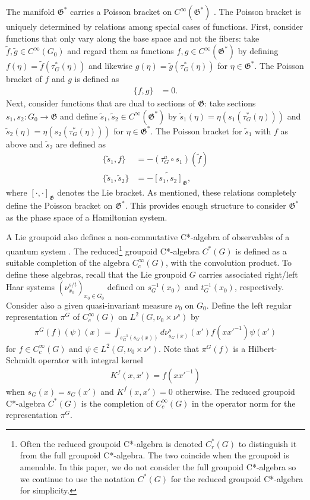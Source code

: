 \documentclass[sn-mathphys,Numbered]{sn-jnl}
\begin{document}
The manifold $\mathfrak{G}^*$ carries a Poisson bracket on $C^\infty(\mathfrak{G}^*)$ \citep{La98b,La99}.  The Poisson bracket is uniquely determined by relations among special cases of functions.  First, consider functions that only vary along the base space and not the fibers: take $\tilde{f},\tilde{g}\in C^\infty(G_0)$ and regard them as functions $f,g\in C^\infty(\mathfrak{G}^*)$ by defining $f(\eta) = \tilde{f}(\tau_G^*(\eta))$ and likewise $g(\eta) = \tilde{g}(\tau_G^*(\eta))$ for $\eta\in\mathfrak{G}^*$.  The Poisson bracket of $f$ and $g$ is defined as
\begin{align}
    \{f,g\} &= 0.
    \end{align}
Next, consider functions that are dual to sections of $\mathfrak{G}$: take sections $s_1,s_2: G_0\to \mathfrak{G}$ and define $\tilde{s}_1,\tilde{s}_2\in C^\infty(\mathfrak{G}^*)$ by $\tilde{s}_1(\eta) = \eta(s_1(\tau^*_G(\eta)))$ and $\tilde{s}_2(\eta) = \eta(s_2(\tau^*_G(\eta)))$ for $\eta\in \mathfrak{G}^*$.  The Poisson bracket for $\tilde{s}_1$ with $f$ as above and $\tilde{s}_2$ are defined as
\begin{align}
    \{\tilde{s}_1,f\} &= -(\tau^a_G\circ s_1)(\tilde{f})\\
    \{\tilde{s}_1,\tilde{s}_2\} &= -\widetilde{[s_1,s_2]}_{\mathfrak{G}},
\end{align}
where $[\cdot,\cdot]_{\mathfrak{G}}$ denotes the Lie bracket.  As mentioned, these relations completely define the Poisson bracket on $\mathfrak{G}^*$.  This provides enough structure to consider $\mathfrak{G}^*$ as the phase space of a Hamiltonian system.

A Lie groupoid also defines a non-commutative C*-algebra of observables of a quantum system \citep{Re80,La98b,La01a}.  The reduced\footnote{Often the reduced groupoid C*-algebra is denoted $C_r^*(G)$ to distinguish it from the full groupoid C*-algebra.  The two coincide when the groupoid is amenable.  In this paper, we do not consider the full groupoid C*-algebra so we continue to use the notation $C^*(G)$ for the reduced groupoid C*-algebra for simplicity.} groupoid C*-algebra $C^*(G)$ is defined as a suitable completion of the algebra $C_c^\infty(G)$, with the convolution product.  To define these algebras, recall that the Lie groupoid $G$ carries associated right/left Haar systems $(\nu_{x_0}^{s/t})_{x_0\in G_0}$ defined on $s_G^{-1}(x_0)$ and $t_G^{-1}(x_0)$, respectively.  Consider also a given quasi-invariant measure $\nu_0$ on $G_0$.  Define the left regular representation $\pi^G$ of $C_c^\infty(G)$ on $L^2(G,\nu_0\times \nu^s)$ by
\begin{align}
\pi^G(f)(\psi)(x) = \int_{s_G^{-1}(s_G(x))} d\nu^s_{s_G(x)}(x')f(xx'^{-1})\psi(x')
\end{align}
for $f\in C_c^\infty(G)$ and $\psi\in L^2(G,\nu_0\times \nu^s)$.  Note that $\pi^G(f)$ is a Hilbert-Schmidt operator with integral kernel
\begin{align}
\label{eq:HSkernel}
    K^f(x,x') = f(xx'^{-1})
\end{align}
when $s_G(x) = s_G(x')$ and $K^f(x,x') = 0$ otherwise.  The reduced groupoid C*-algebra $C^*(G)$ is the completion of $C_c^\infty(G)$ in the operator norm for the representation $\pi^G$.
\end{document}
